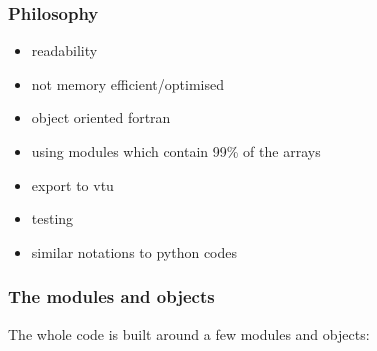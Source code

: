 \subsubsection{Philosophy}
\begin{itemize}
\item readability
\item not memory efficient/optimised
\item object oriented fortran
\item using modules which contain 99\% of the arrays
\item export to vtu 
\item testing
\item similar notations to python codes
\end{itemize}


\subsubsection{The modules and objects}
The whole code is built around a few modules and objects:

%

%

%

%

%

